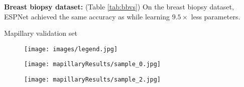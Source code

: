 \documentclass[runningheads]{llncs}
\begin{document}
\noindent \textbf{Breast biopsy dataset:} (Table \ref{tab:bbvs}) On the breast biopsy  dataset, ESPNet achieved the same accuracy as \cite{mehta2017learning} while learning $9.5\times$ less parameters.

\begin{table}[t!]
\centering
\begin{subtable}[b]{0.33\columnwidth}
\centering
{}
\caption{Mapillary validation set \cite{MVD2017}}
\label{tab:mapResults}
\end{subtable}
\hfill
\begin{subtable}[b]{0.6\columnwidth}
\begin{subfigure}[b]{\columnwidth}
\texttt{[image: images/legend.jpg]}
\end{subfigure}
\begin{subfigure}[b]{\columnwidth}
\texttt{[image: mapillaryResults/sample\_0.jpg]}
\end{subfigure}
\begin{subfigure}[b]{\columnwidth}
\texttt{[image: mapillaryResults/sample\_2.jpg]}
\end{subfigure}
\caption{Mapillary validation set \cite{MVD2017} (unseen)}
\label{tab:mapResultsVis}
\end{subtable}
\vfill
\begin{subtable}[b]{0.6\columnwidth}
\centering
{}
\end{subtable}
\end{table}
\end{document}
